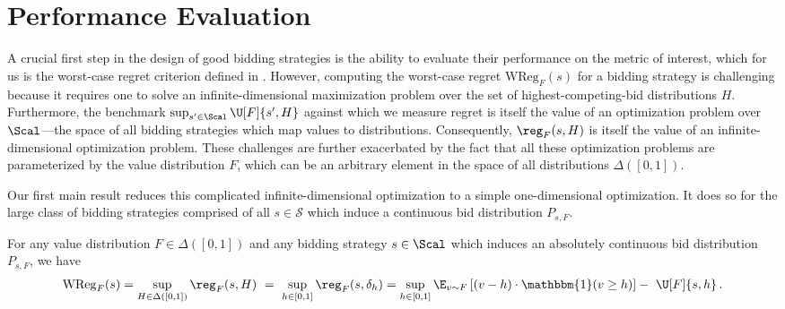 \section{Performance Evaluation}\label{sec:strat_evaluation}

A crucial first step in the design of good bidding strategies is the ability to evaluate their performance on the metric of interest, which for us is the worst-case regret criterion defined in . However, computing the worst-case regret $\mathrm{WReg}_F(s)$ for a bidding strategy is challenging because it requires one to solve an infinite-dimensional maximization problem over the set of highest-competing-bid distributions $H$. Furthermore, the benchmark $\sup_{s' \in \Scal} \U[F]{s',H}$ against which we measure regret is itself the value of an optimization problem over $\Scal$—the space of all bidding strategies which map values to distributions. Consequently, $\reg_F(s,H)$ is itself the value of an infinite-dimensional optimization problem. These challenges are further exacerbated by the fact that all these optimization problems are parameterized by the value distribution $F$, which can be an arbitrary element in the space of all distributions $\Delta([0,1])$.


Our first main result reduces this complicated infinite-dimensional optimization to a simple one-dimensional optimization. It does so for the large class of bidding strategies comprised of all $s \in \mathcal{S}$ which induce a continuous bid distribution $P_{s,F}$.

\begin{theorem}\label{thm:evaluation}
	For any value distribution $F \in \Delta([0,1])$ and any bidding strategy $s \in \Scal$ which induces an absolutely continuous bid distribution $P_{s,F}$, we have
    \begin{align*}
		\mathrm{WReg}_F(s)= \sup_{H \in \Delta([0,1])} \reg_F(s,H)\ =\ \sup_{h\in [0,1]} \reg_F(s,\delta_h)= \sup_{h\in [0,1]}\E_{v \sim F}\left[ (v-h) \cdot \mathbbm{1}(v \geq h) \right]-\ \U[F]{s,h} \,.
    \end{align*}
    \normalsize
\end{theorem}

